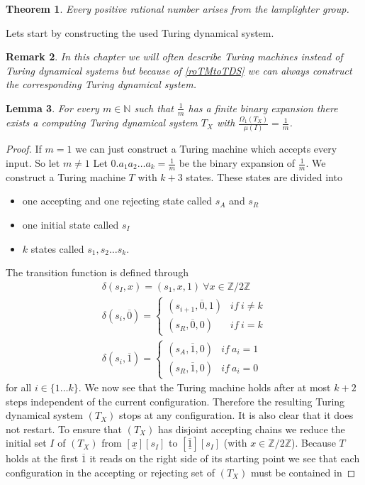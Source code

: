 \documentclass[12pt,a4paper]{scrartcl}
\newtheorem{Theorem}{Theorem}[section]
\newtheorem{Lemma}[Theorem]{Lemma}
\newtheorem{Remark}[Theorem]{Remark}
\numberwithin{equation}{section}
\newcommand{\N}{\mathbb{N}} %
\newcommand{\2}{\mathbb{Z} / 2 \mathbb{Z}}
\newcommand{\1}{\overline{1}}
\newcommand{\0}{\overline{0}}
\begin{document}
\begin{Theorem} \label{mainTh}
	Every positive rational number arises from the lamplighter group.
\end{Theorem}
Lets start by constructing the used Turing dynamical system. 
\begin{Remark}
	In this chapter we will often describe Turing machines instead of Turing dynamical systems but because of \ref{roTMtoTDS} we can always construct the corresponding Turing dynamical system.
\end{Remark}
\begin{Lemma} \label{1TM}
	For every $m \in \N$ such that $\frac{1}{m}$ has a finite binary expansion there exists a computing Turing dynamical system $T_X$ with $\frac{\Omega_1(T_X)}{\mu(I)} = \frac{1}{m}$.
\end{Lemma}
\begin{proof}
	If $m = 1$ we can just construct a Turing machine which accepts every input. So let $m \neq 1$
	Let $0. a_1 a_2 \ldots a_k = \frac{1}{m}$ be the binary expansion of $\frac{1}{m}$. We construct a Turing machine $T$ with $k+3$ states. These states are divided into
	\begin{itemize}
		\item one accepting and one rejecting state called $s_A$ and $s_R$
		\item one initial state called $s_I$
		\item $k$ states called $s_1, s_2 \ldots s_k$.
	\end{itemize}
	The transition function is defined through 
	\begin{align*}
		\delta(s_I, x) = (s_1, x, 1) \ \forall x \in \2 \\
		\delta(s_i, \overline{0}) = \begin{cases}
			(s_{i+1}, \overline{0}, 1) & if \ i \neq k \\
			(s_R, \overline{0}, 0) & if \ i = k
		\end{cases} \\
		\delta(s_i, \overline{1}) = \begin{cases}
			(s_A, \overline{1}, 0) & if \ a_i = 1 \\
			(s_R, \overline{1}, 0) & if \ a_i = 0
		\end{cases}
	\end{align*}
	for all $i \in \{1 \ldots k\}$.	We now see that the Turing machine holds after at most $k+2$ steps independent of the current configuration. Therefore the resulting Turing dynamical system $(T_X)$ stops at any configuration. It is also clear that it does not restart. To ensure that $(T_X)$ has disjoint accepting chains we reduce the initial set $I$ of $(T_X)$ from $[\underline{x}][s_I]$ to $[\underline{\1}][s_I]$ (with $x \in \2$). Because $T$ holds at the first $\overline{1}$ it reads on the right side of its starting point we see that each configuration in the accepting or rejecting set of $(T_X)$ must be contained in

\end{proof}
\end{document}
